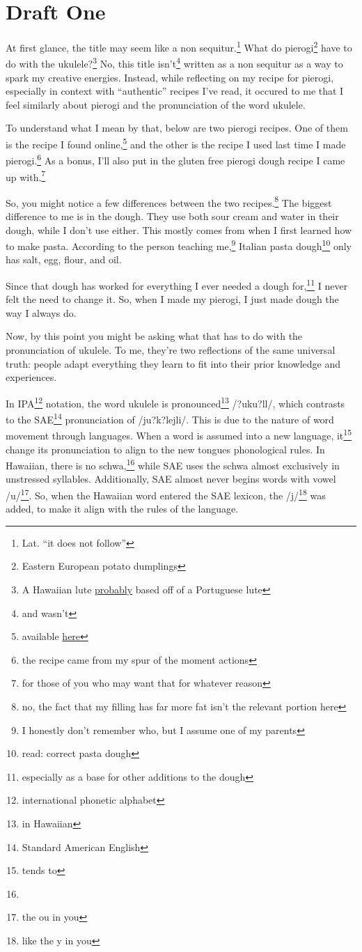 \documentclass[12pt]{article}[titlepage]
\newcommand{\say}[1]{``#1''}
\newcommand{\1}{\={a}}
\newcommand{\2}{\={e}}
\newcommand{\3}{\={\i}}
\newcommand{\4}{\=o}
\newcommand{\5}{\=u}
\newcommand{\6}{\={A}}
\renewcommand{\,}{\textsuperscript{,}}
\begin{document}
\section{Draft One}
At first glance, the title may seem like a non sequitur.\footnote{Lat. \say{it does not follow}}
What do pierogi\footnote{Eastern European potato dumplings} have to do with the ukulele?\footnote{A Hawaiian lute \href{https://en.wikipedia.org/wiki/Ukulele}{probably} based off of a Portuguese lute}
No, this title isn't\footnote{and wasn't} written as a non sequitur as a way to spark my creative energies.
Instead, while reflecting on my recipe for pierogi, especially in context with \say{authentic} recipes I've read, it occured to me that I feel similarly about pierogi and the pronunciation of the word ukulele.

To understand what I mean by that, below are two pierogi recipes.
One of them is the recipe I found online,\footnote{available \href{https://thestayathomechef.com/pierogi/}{here}} and the other is the recipe I used last time I made pierogi.\footnote{the recipe came from my spur of the moment actions}
As a bonus, I'll also put in the gluten free pierogi dough recipe I came up with.\footnote{for those of you who may want that for whatever reason}

So, you might notice a few differences between the two recipes.\footnote{no, the fact that my filling has far more fat isn't the relevant portion here}
The biggest difference to me is in the dough.
They use both sour cream and water in their dough, while I don't use either.
This mostly comes from when I first learned how to make pasta.
According to the person teaching me,\footnote{I honestly don't remember who, but I assume one of my parents} Italian pasta dough\footnote{read: correct pasta dough} only has salt, egg, flour, and oil.

Since that dough has worked for everything I ever needed a dough for,\footnote{especially as a base for other additions to the dough} I never felt the need to change it.
So, when I made my pierogi, I just made dough the way I always do.

Now, by this point you might be asking what that has to do with the pronunciation of ukulele.
To me, they're two reflections of the same universal truth: people adapt everything they learn to fit into their prior knowledge and experiences.

In IPA\footnote{international phonetic alphabet} notation, the word ukulele is pronounced\footnote{in Hawaiian} /?uku?l\textepsilon{}l\textepsilon{}/, which contrasts to the SAE\footnote{Standard American English} pronunciation of /ju?k\textschwa?lejli/.
This is due to the nature of word movement through languages.
When a word is assumed into a new language, it\footnote{tends to} change its pronunciation to align to the new tongues phonological rules.
In Hawaiian, there is no schwa,\footnote{\textschwa{}} while SAE uses the schwa almost exclusively in unstressed syllables.
Additionally, SAE almost never begins words with vowel /u/\footnote{the ou in you}.
So, when the Hawaiian word entered the SAE lexicon, the /j/\footnote{like the y in you} was added, to make it align with the rules of the language.
\end{document}
